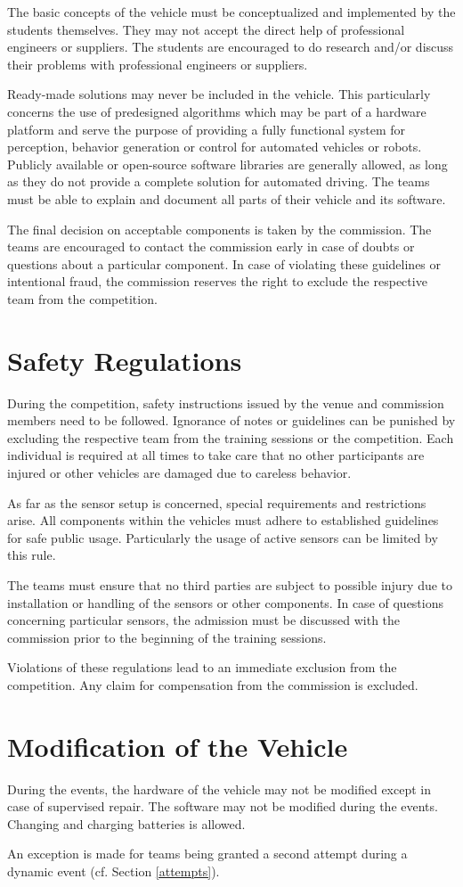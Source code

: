 The basic concepts of the vehicle must be conceptualized and implemented by the students themselves.
They may not accept the direct help of professional engineers or suppliers.
The students are encouraged to do research and/or discuss their problems with professional engineers or suppliers.

Ready-made solutions may never be included in the vehicle.
This particularly concerns the use of predesigned algorithms which may be part of a hardware platform and serve the purpose of providing a fully functional system for perception, behavior generation or control for automated vehicles or robots.
Publicly available or open-source software libraries are generally allowed, as long as they do not provide a complete solution for automated driving.
The teams must be able to explain and document all parts of their vehicle and its software.

The final decision on acceptable components is taken by the commission.
The teams are encouraged to contact the commission early in case of doubts or questions about a particular component.
In case of violating these guidelines or intentional fraud, the commission reserves the right to exclude the respective team from the competition.

\section{Safety Regulations}

During the competition, safety instructions issued by the venue and commission members need to be followed.
Ignorance of notes or guidelines can be punished by excluding the respective team from the training sessions or the competition.
Each individual is required at all times to take care that no other participants are injured or other vehicles are damaged due to careless behavior.

As far as the sensor setup is concerned, special requirements and restrictions arise.
All components within the vehicles must adhere to established guidelines for safe public usage.
Particularly the usage of active sensors can be limited by this rule.

The teams must ensure that no third parties are subject to possible injury due to installation or handling of the sensors or other components.
In case of questions concerning particular sensors, the admission must be discussed with the commission prior to the beginning of the training sessions.

Violations of these regulations lead to an immediate exclusion from the competition.
Any claim for compensation from the commission is excluded.

\section{Modification of the Vehicle}

During the events, the hardware of the vehicle may not be modified except in case of supervised repair.
The software may not be modified during the events.
Changing and charging batteries is allowed.

An exception is made for teams being granted a second attempt during a dynamic event (cf. Section \ref{attempts}).